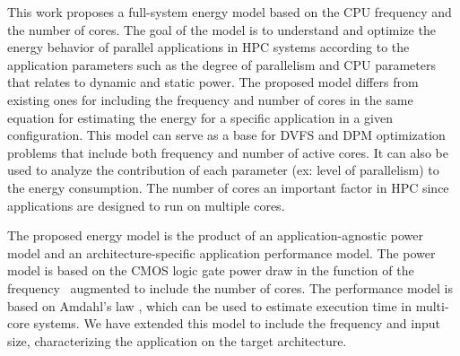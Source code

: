 This work proposes a full-system energy model based on the CPU frequency and the number of cores. The goal of the model is to understand and optimize the energy behavior of parallel applications in HPC systems according to the application parameters such as the degree of parallelism and CPU parameters that relates to dynamic and static power. The proposed model differs from existing ones for including the frequency and number of cores in the same equation for estimating the energy for a specific application in a given configuration. This model can serve as a base for DVFS and DPM optimization problems that include both frequency and number of active cores. It can also be used to analyze the contribution of each parameter (ex: level of parallelism) to the energy consumption. The number of cores an important factor in HPC since applications are designed to run on multiple cores.

The proposed energy model is the product of an application-agnostic power model and an architecture-specific application performance model. The power model is based on the CMOS logic gate power draw in the function of the frequency~\cite{Sarwar1997, Butzen2007} augmented to include the number of cores. The performance model is based on Amdahl's law \cite{Amdahl1967ValidityCapabilities, Eyerman2010ModelingDesign, Shi2015ReevaluatingLaw}, which can be used to estimate execution time in multi-core systems. We have extended  this model to include the frequency and input size, characterizing the application on the target architecture.


